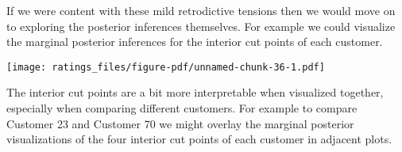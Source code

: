 \documentclass[
  letterpaper,
  DIV=11,
  numbers=noendperiod]{scrartcl}
\newenvironment{Shaded}{\begin{snugshade}}{\end{snugshade}}
\newcommand{\AttributeTok}[1]{\textcolor[rgb]{0.40,0.45,0.13}{#1}}
\newcommand{\ControlFlowTok}[1]{\textcolor[rgb]{0.00,0.23,0.31}{#1}}
\newcommand{\DecValTok}[1]{\textcolor[rgb]{0.68,0.00,0.00}{#1}}
\newcommand{\FunctionTok}[1]{\textcolor[rgb]{0.28,0.35,0.67}{#1}}
\newcommand{\NormalTok}[1]{\textcolor[rgb]{0.00,0.23,0.31}{#1}}
\newcommand{\OtherTok}[1]{\textcolor[rgb]{0.00,0.23,0.31}{#1}}
\newcommand{\SpecialCharTok}[1]{\textcolor[rgb]{0.37,0.37,0.37}{#1}}
\newcommand{\StringTok}[1]{\textcolor[rgb]{0.13,0.47,0.30}{#1}}
\begin{document}
If we were content with these mild retrodictive tensions then we would
move on to exploring the posterior inferences themselves. For example we
could visualize the marginal posterior inferences for the interior cut
points of each customer.

\begin{Shaded}
\end{Shaded}

\texttt{[image: ratings\_files/figure-pdf/unnamed-chunk-36-1.pdf]}

The interior cut points are a bit more interpretable when visualized
together, especially when comparing different customers. For example to
compare Customer 23 and Customer 70 we might overlay the marginal
posterior visualizations of the four interior cut points of each
customer in adjacent plots.
\end{document}
